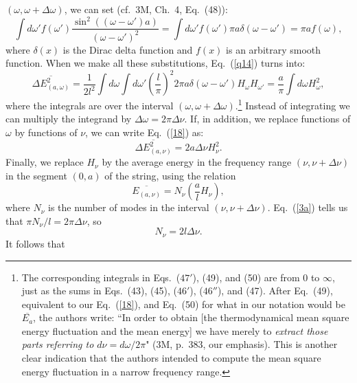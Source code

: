 \documentclass{elsart}
\begin{document}
$(\omega, \omega + \Delta \omega)$, we can set (cf.\ 3M, Ch.\ 4, Eq.\ (48)):
\begin{equation}
\int d \omega' f(\omega') \frac{ \sin^2{((\omega - \omega')a)}}{(\omega - \omega')^2} = \int d\omega' f(\omega') \pi a \delta(\omega - \omega') = \pi a f(\omega),
\label{17}
\end{equation}
where $\delta(x)$ is the Dirac delta function and $f(x)$ is an arbitrary smooth function. 
When we make all these substitutions, Eq.\ (\ref{q14}) turns into:
\begin{equation}
\overline{\Delta E_{(a, \omega)}^2} = \frac{1}{2l^2} \int d\omega \int d\omega' \left( \frac{l}{\pi} \right)^2
2 \pi a \delta(\omega - \omega') H_\omega H_{\omega'} = \frac{a}{\pi} \int d\omega H^2_\omega,
\label{18}
\end{equation}
where the integrals are over the interval $(\omega, \omega + \Delta \omega)$.\footnote{The corresponding integrals in Eqs.\ ($47'$), (49), and (50) are from 0 to $\infty$, just as the sums in Eqs.\ (43), (45), ($46'$), ($46''$), and (47). After Eq.\ (49), equivalent to our Eq.\ (\ref{18}), and Eq.\ (50) for what in our notation would be $\overline{E_a}$, the authors write:  ``In order to obtain [the thermodynamical mean square energy fluctuation and the mean energy] we have merely to {\it extract those parts referring to $d \nu = d \omega/2 \pi$}" (3M, p.\ 383, our emphasis). This is another clear indication that the authors intended to compute the mean square energy fluctuation in a narrow frequency range.} Instead of integrating we can multiply the integrand by $\Delta \omega = 2 \pi \Delta \nu$. If, in addition, we replace functions of $\omega$ by functions of $\nu$, we can write Eq.\ (\ref{18}) as:
\begin{equation}
\overline{\Delta E_{(a, \nu)}^2} = 2a \Delta \nu H^2_\nu.
\label{18a}
\end{equation}
Finally, we replace $H_\nu$ by the average energy in the frequency range $(\nu, \nu + \Delta \nu)$ in the segment $(0,a)$ of the string, using the relation
\begin{equation}
\overline{E_{(a, \nu)}} = N_\nu \left( \frac{a}{l} H_\nu \right),
\label{19}
\end{equation}
where $N_\nu$ is the number of modes in the interval $(\nu, \nu + \Delta \nu)$. Eq.\ (\ref{3a}) tells us that $\pi N_\nu/l = 2 \pi \Delta \nu$, so
\begin{equation}
N_\nu = 2l \Delta \nu.
\label{20}
\end{equation}
It follows that 
\end{document}
